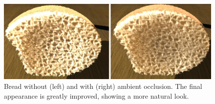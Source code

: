 \begin{figure}
\centerline{\includegraphics[width=13cm]{figures/occlusion}}
  \caption{Bread without (left) and with (right) ambient occlusion. The final appearance is greatly improved, showing a more natural look. }
  \label{fg:occlusion}
\end{figure}

